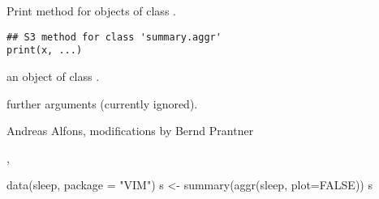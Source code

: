 %
\begin{Description}\relax
Print method for objects of class .
\end{Description}
%
\begin{Usage}
\begin{verbatim}
## S3 method for class 'summary.aggr'
print(x, ...)
\end{verbatim}
\end{Usage}
%
\begin{Arguments}
\begin{ldescription}
\item[\code{x}] an object of class .
\item[\code{...}] further arguments (currently ignored).
\end{ldescription}
\end{Arguments}
%
\begin{Author}\relax
Andreas Alfons, modifications by Bernd Prantner
\end{Author}
%
\begin{SeeAlso}\relax
{}, 
\end{SeeAlso}
%
\begin{Examples}
\begin{ExampleCode}
data(sleep, package = "VIM")
s <- summary(aggr(sleep, plot=FALSE))
s
\end{ExampleCode}
\end{Examples}
